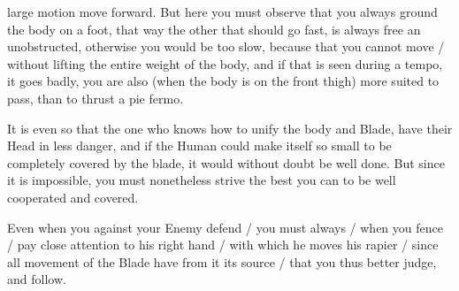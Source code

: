 \newpage


\newpage


large motion move forward. But here you must observe that you always
ground the body on a foot, that way the other that should go fast, is
always free an unobstructed, otherwise you would be too slow, because
that you cannot move / without lifting the entire weight of the body,
and if that is seen during a tempo, it goes badly, you are also (when
the body is on the front thigh) more suited to pass, than to thrust a
pie fermo.


It is even so that the one who knows how to unify the body and Blade,
have their Head in less danger, and if the Human could make itself so
small to be completely covered by the blade, it would without doubt be
well done. But since it is impossible, you must nonetheless strive the
best you can to be well cooperated and covered.


Even when you against your Enemy defend / you must always / when you
fence / pay close attention to his right hand / with which he moves
his rapier / since all movement of the Blade have from it its source /
that you thus better judge, and follow.

